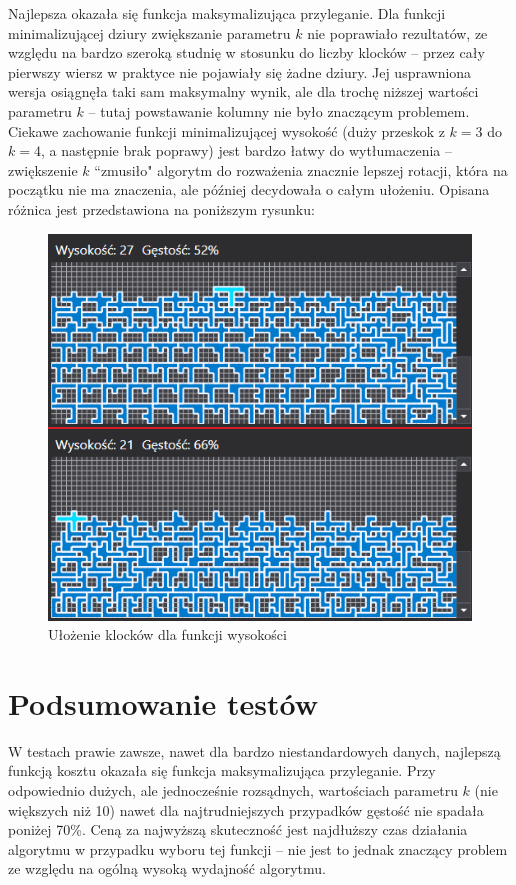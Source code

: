 \documentclass{article}
\begin{document}
Najlepsza okazała się funkcja maksymalizująca przyleganie. Dla funkcji minimalizującej dziury zwiększanie parametru $k$ nie poprawiało rezultatów, ze względu na bardzo szeroką studnię w stosunku do liczby klocków -- przez cały pierwszy wiersz w praktyce nie pojawiały się żadne dziury. Jej usprawniona wersja osiągnęła taki sam maksymalny wynik, ale dla trochę niższej wartości parametru $k$ -- tutaj powstawanie kolumny nie było znaczącym problemem.
Ciekawe zachowanie funkcji minimalizującej wysokość (duży przeskok z $k=3$ do $k=4$, a następnie brak poprawy) jest bardzo łatwy do wytłumaczenia -- zwiększenie $k$ ``zmusiło" algorytm do rozważenia znacznie lepszej rotacji, która na początku nie ma znaczenia, ale później decydowała o całym ułożeniu. Opisana różnica jest przedstawiona na poniższym rysunku: 
\begin{figure}[H]
\includegraphics[width=\textwidth]{wysokosc_bekas.PNG}
\caption{Ułożenie klocków dla funkcji wysokości}
\end{figure}




\section{Podsumowanie testów} 
W testach prawie zawsze, nawet dla bardzo niestandardowych danych, najlepszą funkcją kosztu okazała się funkcja maksymalizująca przyleganie. Przy odpowiednio dużych, ale jednocześnie rozsądnych, wartościach parametru $k$ (nie większych niż 10) nawet dla najtrudniejszych przypadków gęstość nie spadała poniżej 70\%. Ceną za najwyższą skuteczność jest najdłuższy czas działania algorytmu w przypadku wyboru tej funkcji -- nie jest to jednak znaczący problem ze względu na ogólną wysoką wydajność algorytmu.
\end{document}
